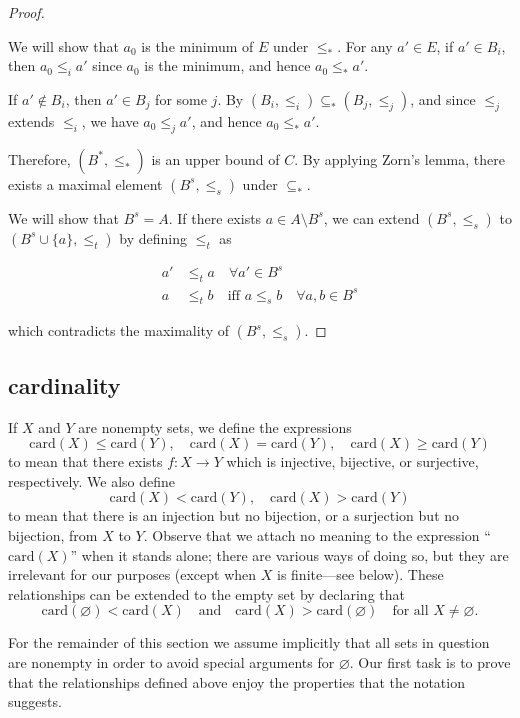 \begin{proof}
\begin{enumerate}
        We will show that $a_0$ is the minimum of $E$ under $\le_*$. For any $a' \in E$,
        if $a' \in B_i$, then $a_0 \le_i a'$ since $a_0$ is the minimum, and hence $a_0 \le_* a'$.

        If $a' \notin B_i$, then $a' \in B_j$ for some $j$. By $(B_i, \le_i) \subseteq_* (B_j, \le_j)$,
        and since $\le_j$ extends $\le_i$, we have $a_0 \le_j a'$, and hence $a_0 \le_* a'$.

    \end{enumerate}

    Therefore, $(B^*, \le_*)$ is an upper bound of $C$. By applying Zorn's lemma, 
    there exists a maximal element $(B^{s}, \le_{s})$ under $\subseteq_*$.

    We will show that $B^s = A$. If there exists $a \in A \setminus B^s$, we can extend $(B^s, \le_s)$
    to $(B^s \cup \{ a \}, \le_{t})$ by defining $\le_{t}$ as

    \begin{align*}
        a' & \le_t a \quad \forall a' \in B^s \\
        a  & \le_t b \quad \text{iff } a \le_s b \quad \forall a,b \in B^s
    \end{align*}

    which contradicts the maximality of $(B^s, \le_s)$.

\end{proof}

\subsection{cardinality}

\begin{definition}
    If $X$ and $Y$ are nonempty sets, we define the expressions
\[
\mathrm{card}(X) \leq \mathrm{card}(Y), \quad
\mathrm{card}(X) = \mathrm{card}(Y), \quad
\mathrm{card}(X) \geq \mathrm{card}(Y)
\]
to mean that there exists $f : X \to Y$ which is injective, bijective, or surjective,
respectively. We also define
\[
\mathrm{card}(X) < \mathrm{card}(Y), \quad
\mathrm{card}(X) > \mathrm{card}(Y)
\]
to mean that there is an injection but no bijection, or a surjection but no bijection,
from $X$ to $Y$. Observe that we attach no meaning to the expression
``$\mathrm{card}(X)$'' when it stands alone; there are various ways of doing so, but
they are irrelevant for our purposes (except when $X$ is finite---see below). These
relationships can be extended to the empty set by declaring that
\[
\mathrm{card}(\varnothing) < \mathrm{card}(X)
\quad\text{and}\quad
\mathrm{card}(X) > \mathrm{card}(\varnothing)
\quad\text{for all } X \neq \varnothing.
\]

For the remainder of this section we assume implicitly that all sets in question are
nonempty in order to avoid special arguments for $\varnothing$. Our first task is to prove
that the relationships defined above enjoy the properties that the notation suggests.
\end{definition}

